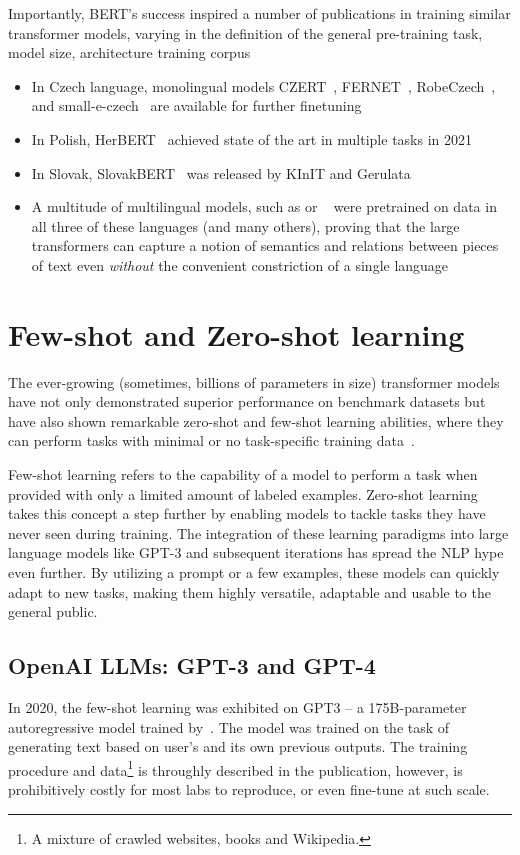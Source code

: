 Importantly, BERT's success inspired a number of publications in training similar transformer models, varying in the definition of the general pre-training task, model size, architecture training corpus

\begin{itemize}
    \item In Czech language, monolingual models CZERT~\cite{czert}, FERNET~\cite{fernet}, RobeCzech~\cite{straka2021robeczech}, and small-e-czech~\cite{kocian2021siamese} are available for further finetuning
    \item In Polish, HerBERT~\cite{mroczkowski-etal-2021-herbert} achieved state of the art in multiple tasks in 2021
    \item In Slovak, SlovakBERT~\cite{pikuliak2021slovakbert} was released by KInIT and Gerulata
    \item A multitude of multilingual models, such as \MBERT or \XLM~\cite{xlm-roberta} were pretrained on data in all three of these languages (and many others), proving that the large transformers can capture a notion of semantics and relations between pieces of text even \textit{without} the convenient constriction of a single language 
\end{itemize}

\section{Few-shot and Zero-shot learning}
\label{sec:llms}
The ever-growing (sometimes, billions of parameters in size) transformer models have not only demonstrated superior performance on benchmark datasets but have also shown remarkable zero-shot and few-shot learning abilities, where they can perform tasks with minimal or no task-specific training data~\cite{gpt3}.

Few-shot learning refers to the capability of a model to perform a task when provided with only a limited amount of labeled examples. Zero-shot learning takes this concept a step further by enabling models to tackle tasks they have never seen during training. The integration of these learning paradigms into large language models like GPT-3 and subsequent iterations has spread the NLP hype even further. By utilizing a prompt or a few examples, these models can quickly adapt to new tasks, making them highly versatile, adaptable and usable to the general public.
\subsection{OpenAI LLMs: GPT-3 and GPT-4}
\label{sec:gpt}
In 2020, the few-shot learning was exhibited on GPT3 -- a 175B-parameter autoregressive model trained by~\cite{gpt3}. The model was trained on the task of generating text based on user's and its own previous outputs.
The training procedure and data\footnote{A mixture of crawled websites, books and Wikipedia.} is throughly described in the publication, however, is prohibitively costly for most labs to reproduce, or even fine-tune at such scale. 

